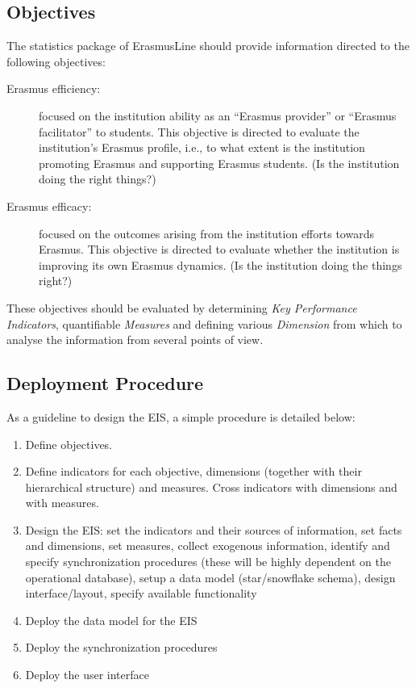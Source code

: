 \subsection{Objectives}

The statistics package of ErasmusLine should provide information directed to the
following objectives:

\begin{description}
\item[Erasmus efficiency:] focused on the institution ability as an ``Erasmus
provider'' or ``Erasmus facilitator'' to students. This objective is directed to
evaluate the institution’s Erasmus profile, i.e., to what extent is the
institution promoting Erasmus and supporting Erasmus students. (Is the
institution doing the right things?)

\item[Erasmus efficacy:] focused on the outcomes arising from the institution
efforts towards Erasmus. This objective is directed to evaluate whether the
institution is improving its own Erasmus dynamics. (Is the institution doing the
things right?)
\end{description}

These objectives should be evaluated by determining \emph{Key Performance
Indicators}, quantifiable \emph{Measures} and defining various \emph{Dimension}
from which to analyse the information from several points of view.

\subsection{Deployment Procedure}

As a guideline to design the EIS, a simple procedure is detailed below:
\begin{enumerate}
\item Define objectives.
\item Define indicators for each objective, dimensions (together with their
 hierarchical structure) and measures. Cross indicators with dimensions and with measures. 
\item Design the EIS: set the indicators and their sources of information,
set facts and dimensions, set measures, collect exogenous information, identify
and specify synchronization procedures (these will be highly dependent on the
operational database), setup a data model (star/snowflake schema), design
interface/layout, specify available functionality
\item Deploy the data model for the EIS
\item Deploy the synchronization procedures
\item Deploy the user interface
\end{enumerate}

